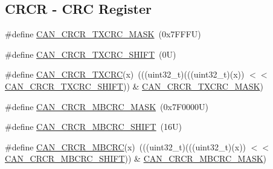 \subsection*{C\+R\+CR -\/ C\+RC Register}
\begin{DoxyCompactItemize}
\item 
\#define \mbox{\hyperlink{group___c_a_n___register___masks_ga84c305cf0ec60d0624b454e280c69c4b}{C\+A\+N\+\_\+\+C\+R\+C\+R\+\_\+\+T\+X\+C\+R\+C\+\_\+\+M\+A\+SK}}~(0x7\+F\+F\+F\+U)
\item 
\#define \mbox{\hyperlink{group___c_a_n___register___masks_ga56fca714ec47e9786fdf7e9378c660aa}{C\+A\+N\+\_\+\+C\+R\+C\+R\+\_\+\+T\+X\+C\+R\+C\+\_\+\+S\+H\+I\+FT}}~(0\+U)
\item 
\#define \mbox{\hyperlink{group___c_a_n___register___masks_ga2c7cb04502b4f8ab4f5e005dc3512ba2}{C\+A\+N\+\_\+\+C\+R\+C\+R\+\_\+\+T\+X\+C\+RC}}(x)~(((uint32\+\_\+t)(((uint32\+\_\+t)(x)) $<$$<$ \mbox{\hyperlink{group___c_a_n___register___masks_ga56fca714ec47e9786fdf7e9378c660aa}{C\+A\+N\+\_\+\+C\+R\+C\+R\+\_\+\+T\+X\+C\+R\+C\+\_\+\+S\+H\+I\+FT}})) \& \mbox{\hyperlink{group___c_a_n___register___masks_ga84c305cf0ec60d0624b454e280c69c4b}{C\+A\+N\+\_\+\+C\+R\+C\+R\+\_\+\+T\+X\+C\+R\+C\+\_\+\+M\+A\+SK}})
\item 
\#define \mbox{\hyperlink{group___c_a_n___register___masks_ga8b17ddaa608ead97f25b59e5919d079c}{C\+A\+N\+\_\+\+C\+R\+C\+R\+\_\+\+M\+B\+C\+R\+C\+\_\+\+M\+A\+SK}}~(0x7\+F0000\+U)
\item 
\#define \mbox{\hyperlink{group___c_a_n___register___masks_ga1d18c789e52dbae45dc581a3327a1bde}{C\+A\+N\+\_\+\+C\+R\+C\+R\+\_\+\+M\+B\+C\+R\+C\+\_\+\+S\+H\+I\+FT}}~(16\+U)
\item 
\#define \mbox{\hyperlink{group___c_a_n___register___masks_gaab5690dca6900f95d513ea5178e1ad25}{C\+A\+N\+\_\+\+C\+R\+C\+R\+\_\+\+M\+B\+C\+RC}}(x)~(((uint32\+\_\+t)(((uint32\+\_\+t)(x)) $<$$<$ \mbox{\hyperlink{group___c_a_n___register___masks_ga1d18c789e52dbae45dc581a3327a1bde}{C\+A\+N\+\_\+\+C\+R\+C\+R\+\_\+\+M\+B\+C\+R\+C\+\_\+\+S\+H\+I\+FT}})) \& \mbox{\hyperlink{group___c_a_n___register___masks_ga8b17ddaa608ead97f25b59e5919d079c}{C\+A\+N\+\_\+\+C\+R\+C\+R\+\_\+\+M\+B\+C\+R\+C\+\_\+\+M\+A\+SK}})
\end{DoxyCompactItemize}
